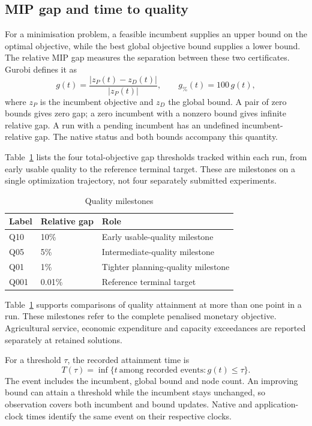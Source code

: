 \documentclass[11pt,a4paper]{article}
\begin{document}
\subsection{MIP gap and time to quality}
\label{sec:quality}

For a minimisation problem, a feasible incumbent supplies an upper bound on the optimal objective, while the best global objective bound supplies a lower bound. The relative MIP gap measures the separation between these two certificates. Gurobi defines it as
\begin{equation}
 g(t)=\frac{|z_P(t)-z_D(t)|}{|z_P(t)|},\qquad
 g_{\%}(t)=100\,g(t),
 \label{eq:gap}
\end{equation}
where $z_P$ is the incumbent objective and $z_D$ the global bound. A pair of zero bounds gives zero gap; a zero incumbent with a nonzero bound gives infinite relative gap. A run with a pending incumbent has an undefined incumbent-relative gap. The native status and both bounds accompany this quantity.

Table~\ref{tab:quality} lists the four total-objective gap thresholds tracked within each run, from early usable quality to the reference terminal target. These are milestones on a single optimization trajectory, not four separately submitted experiments.

\begin{table}[H]\centering\small
\caption{Quality milestones}\label{tab:quality}
\begin{tabular}{lll}\toprule
Label&Relative gap&Role\\\midrule
Q10&10\%&Early usable-quality milestone\\
Q05&5\%&Intermediate-quality milestone\\
Q01&1\%&Tighter planning-quality milestone\\
Q001&0.01\%&Reference terminal target\\\bottomrule
\end{tabular}
\end{table}

Table~\ref{tab:quality} supports comparisons of quality attainment at more than one point in a run. These milestones refer to the complete penalised monetary objective. Agricultural service, economic expenditure and capacity exceedances are reported separately at retained solutions.

For a threshold $\tau$, the recorded attainment time is
\begin{equation}
 T(\tau)=\inf\{t\ \text{among recorded events}:g(t)\le\tau\}.
 \label{eq:target}
\end{equation}
The event includes the incumbent, global bound and node count. An improving bound can attain a threshold while the incumbent stays unchanged, so observation covers both incumbent and bound updates. Native and application-clock times identify the same event on their respective clocks.
\end{document}
